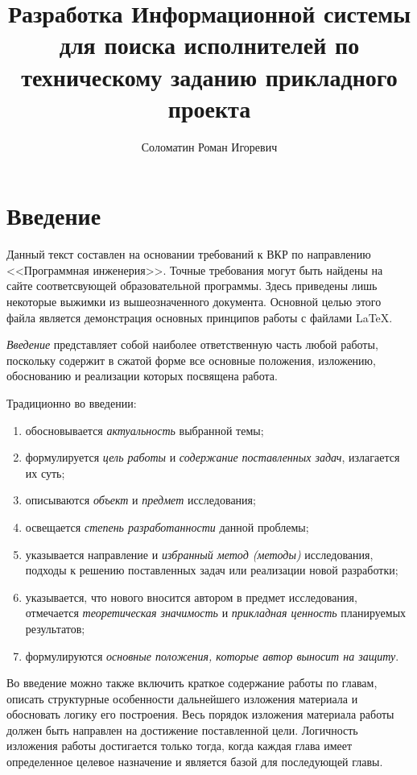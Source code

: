 \documentclass[PI,VKR]{HSEUniversity}
\title{Разработка Информационной системы для поиска исполнителей по техническому заданию прикладного проекта}
\author{Соломатин Роман Игоревич}
\begin{document}
\maketitle

\chapter*{Введение}

Данный текст составлен на основании требований к ВКР по направлению <<Программная инженерия>>. Точные требования могут быть найдены на сайте соответсвующей образовательной программы. Здесь приведены лишь некоторые выжимки из вышеозначенного документа. Основной целью этого файла является демонстрация основных принципов работы с файлами \LaTeX{}.

\emph{Введение} представляет собой наиболее ответственную часть любой работы, поскольку содержит в сжатой форме все основные положения, изложению, обоснованию и реализации которых посвящена работа.

Традиционно во введении:
\begin{enumerate}
	\item  обосновывается \emph{актуальность} выбранной темы;
	\item  формулируется \emph{цель работы} и \emph{содержание поставленных задач}, излагается их суть;
	\item  описываются \emph{объект} и \emph{предмет} исследования;
	\item  освещается \emph{степень разработанности} данной проблемы;
	\item  указывается направление и \emph{избранный метод (методы)} исследования, подходы к решению поставленных задач или реализации новой разработки;
	\item  указывается, что нового вносится автором в предмет исследования, отмечается \emph{теоретическая значимость} и \emph{прикладная ценность} планируемых результатов;
	\item  формулируются \emph{основные положения, которые автор выносит на защиту}.
\end{enumerate}

Во введение можно также включить краткое содержание работы по главам, описать структурные особенности дальнейшего изложения материала и обосновать логику его построения. Весь порядок изложения материала работы должен быть направлен на достижение поставленной цели. Логичность изложения работы достигается только тогда, когда каждая глава имеет определенное целевое назначение и является базой для последующей главы.
\end{document}
